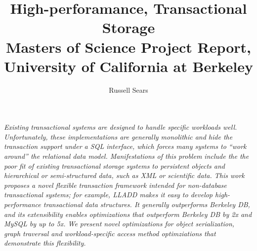 \documentclass[10pt,letterpaper,twocolumn,english]{article}
\newcommand{\yad}{LLADD\xspace}
\begin{document}
\title{\vspace*{-36pt}High-perforamance, Transactional Storage\\
\large{Masters of Science Project Report, University of California at Berkeley}}
\author{Russell Sears}
\maketitle



{\em Existing transactional systems are designed to handle specific
workloads well.  Unfortunately, these implementations are generally
monolithic and hide the transaction support under a SQL interface, which forces many systems to ``work around'' the relational data model.
Manifestations of this problem include the 
the poor fit of existing transactional storage systems to persistent
objects and hierarchical or semi-structured data, such as XML or
scientific data.  This work proposes a novel flexible transaction
framework intended for non-database transactional systems; for
example, \yad makes it easy to develop high-performance transactional
data structures. It generally outperforms Berkeley DB, and its
extensibility enables optimizations that outperform Berkeley DB by 2x
and MySQL by up to 5x.  We present novel optimizations for object
serialization, graph traversal and workload-specific access method 
optimziations that demonstrate this flexibility.}

\end{document}
